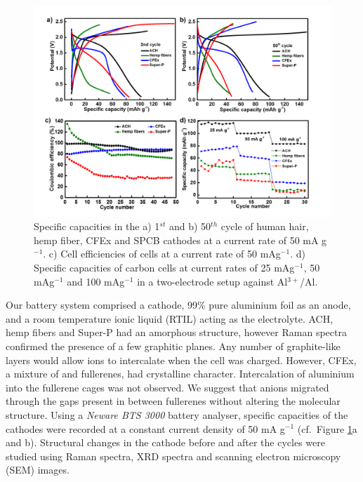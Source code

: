 \documentclass{article}
\begin{document}
\begin{figure}[tbh!]
  \centering
  \includegraphics[width=\textwidth]{figures/CDCall}
    \caption{Specific capacities in the a) 1$^{st}$ and b) 50$^{th}$ cycle of human hair, hemp fiber, CFEx and SPCB cathodes at a current rate of 50 mA g$^{-1}$. c) Cell efficiencies of cells at a current rate of 50 mAg$^{-1}$. d) Specific capacities of carbon cells at current rates of 25 mAg$^{-1}$, 50 mAg$^{-1}$ and 100 mAg$^{-1}$ in a two-electrode setup against Al$^{3+}$/Al. }
  \label{figures:CDCall}
\end{figure}

Our battery system comprised a cathode, 99\% pure aluminium foil as an anode, and a room temperature ionic liquid (RTIL) acting as the electrolyte. ACH, hemp fibers and Super-P had an amorphous structure, however Raman spectra confirmed the presence of a few graphitic planes. Any number of graphite-like layers would allow  ions to intercalate when the cell was charged. However, CFEx, a mixture of  and  fullerenes, had crystalline character. Intercalation of aluminium into the fullerene cages was not observed. We suggest that  anions migrated through the gaps present in between fullerenes without altering the molecular structure. Using a \textit{Neware BTS 3000} battery analyser, specific capacities of the cathodes were recorded at a constant current density of 50 mA g$^{-1}$ (cf.\ Figure \ref{figures:CDCall}a and b). Structural changes in the cathode before and after the cycles were studied using Raman spectra, XRD spectra and scanning electron microscopy (SEM) images.
\end{document}
